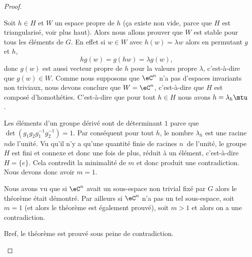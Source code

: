 \begin{proof}
\begin{subproof}
		Soit \( h\in H\) et \( W\) un espace propre de \( h\) (ça existe non vide, parce que \( H\) est triangularisé, voir plus haut). Alors nous allons prouver que \( W\) est stable pour tous les éléments de \( G\). En effet si \( w\in W\) avec \( h(w)=\lambda w\) alors en permutant \( g\) et \( h\),
		\begin{equation}
			hg(w)=g(hw)=\lambda g(w),
		\end{equation}
		donc \( g(w)\) est aussi vecteur propre de \( h\) pour la valeurs propre \( \lambda\), c'est-à-dire que \( g(w)\in W\). Comme nous supposons que \( \eC^n\) n'a pas d'espaces invariants non triviaux, nous devons conclure que \( W=\eC^n\), c'est-à-dire que \( H\) est composé d'homothéties. C'est-à-dire que pour tout \( h\in H\) nous avons \( h=\lambda_h\mtu\).


		Les éléments d'un groupe dérivé sont de déterminant \( 1\) parce que \( \det(g_1g_2g_1^{-1}g_2^{-1})=1\). Par conséquent pour tout \( h\), le nombre \( \lambda_h\) est une racine \( n\)\ieme de l'unité. Vu qu'il n'y a qu'une quantité finie de racines \( n\)\ieme\ de l'unité, le groupe \( H\) est fini et connexe et donc une fois de plus, réduit à un élément, c'est-à-dire \( H=\{ e \}\). Cela contredit la minimalité de \( m\) et donc produit une contradiction. Nous devons donc avoir \( m=1\).

		\spitem[Conclusion]
		Nous avons vu que si \( \eC^n\) avait un sous-espace non trivial fixé par \( G\) alors le théorème était démontré. Par ailleurs si \( \eC^n\) n'a pas un tel sous-espace, soit \( m=1\) (et alors le théorème est également prouvé), soit \( m>1\) et alors on a une contradiction.

		Bref, le théorème est prouvé sous peine de contradiction.
	\end{subproof}
\end{proof}


